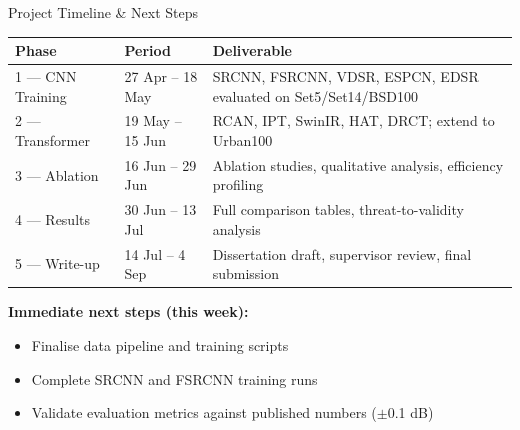 \documentclass[aspectratio=169]{beamer}
\begin{document}
\begin{frame}{Project Timeline \& Next Steps}
  \begin{center}
  \small
  \begin{tabular}{@{}llp{6.5cm}@{}}
    \toprule
    \textbf{Phase} & \textbf{Period} & \textbf{Deliverable} \\
    \midrule
    1 — CNN Training     & 27 Apr – 18 May & SRCNN, FSRCNN, VDSR, ESPCN, EDSR evaluated on Set5/Set14/BSD100 \\
    2 — Transformer      & 19 May – 15 Jun & RCAN, IPT, SwinIR, HAT, DRCT; extend to Urban100 \\
    3 — Ablation         & 16 Jun – 29 Jun & Ablation studies, qualitative analysis, efficiency profiling \\
    4 — Results          & 30 Jun – 13 Jul & Full comparison tables, threat-to-validity analysis \\
    5 — Write-up         & 14 Jul – 4 Sep  & Dissertation draft, supervisor review, final submission \\
    \bottomrule
  \end{tabular}
  \end{center}
  \vspace{8pt}
  \textbf{Immediate next steps (this week):}
  \begin{itemize}
    \item Finalise data pipeline and training scripts
    \item Complete SRCNN and FSRCNN training runs
    \item Validate evaluation metrics against published numbers ($\pm$0.1 dB)
  \end{itemize}
\end{frame}
\end{document}
